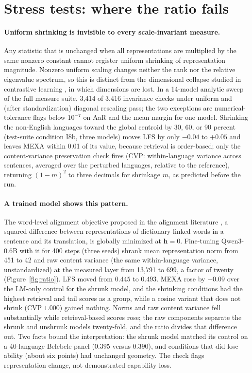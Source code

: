 \documentclass{article} %
\def\vh{{\bm{h}}}
\begin{document}
\section{Stress tests: where the ratio fails}
\label{sec:stress}

\paragraph{Uniform shrinking is invisible to every scale-invariant measure.} Any statistic that is unchanged when all representations are multiplied by the same nonzero constant cannot register uniform shrinking of representation magnitude. Nonzero uniform scaling changes neither the rank nor the relative eigenvalue spectrum, so this is distinct from the dimensional collapse studied in contrastive learning \citep{jing2022collapse,wang2020uniformity}, in which dimensions are lost. In a 14-model analytic sweep of the full measure suite, 3,414 of 3,416 invariance checks under uniform and (after standardization) diagonal rescaling pass; the two exceptions are numerical-tolerance flags below $10^{-7}$ on AaR and the mean margin for one model. Shrinking the non-English languages toward the global centroid by 30, 60, or 90 percent (test-suite condition I8b, three models) moves LFS by only $-0.04$ to $+0.05$ and leaves MEXA within 0.01 of its value, because retrieval is order-based; only the content-variance preservation check fires (CVP: within-language variance across sentences, averaged over the perturbed languages, relative to the reference), returning $(1-m)^2$ to three decimals for shrinkage $m$, as predicted before the run.

\paragraph{A trained model shows this pattern.} The word-level alignment objective proposed in the alignment literature \citep{cao2020alignment}, a squared difference
between representations of dictionary-linked words in a sentence and its
translation, is globally minimized at $\vh = 0$. Fine-tuning Qwen3-0.6B with
it for 400 steps (three seeds) shrank mean representation norm from 451 to 42
and raw content variance (the same within-language variance, unstandardized) at the measured layer from 13,791 to 699, a factor of twenty (Figure~\ref{fig:ratio}). LFS moved from $0.445$ to $0.493$. MEXA rose by $+0.09$ over the LM-only control for the shrunk model, and the shrinking conditions had the highest retrieval and tail scores as a group, while a cosine variant that does not shrink (CVP $1.000$) gained nothing. Norms and raw content variance fell substantially while retrieval-based scores rose; the raw components separate the shrunk and unshrunk models twenty-fold, and the ratio divides that difference out. Two facts bound the interpretation: the shrunk model matched its control on a 40-language Belebele panel ($0.395$ versus $0.390$), and conditions that did lose ability (about six points) had unchanged geometry. The check flags representation change, not demonstrated capability loss.
\end{document}

